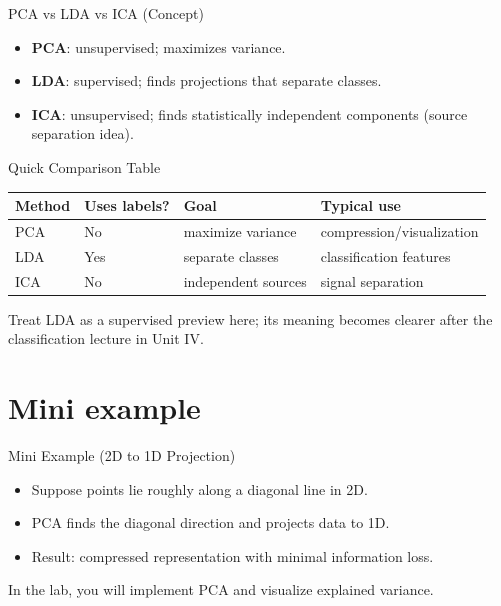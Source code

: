 \documentclass[aspectratio=169]{beamer}
\begin{document}
\begin{frame}{PCA vs LDA vs ICA (Concept)}
  \begin{itemize}[<+->]
    \item \textbf{PCA}: unsupervised; maximizes variance.
    \item \textbf{LDA}: supervised; finds projections that separate classes.
    \item \textbf{ICA}: unsupervised; finds statistically independent components (source separation idea).
  \end{itemize}
\end{frame}

\begin{frame}{Quick Comparison Table}
  \centering
  \begin{tabular}{llll}
    \toprule
    \textbf{Method} & \textbf{Uses labels?} & \textbf{Goal} & \textbf{Typical use} \\
    \midrule
    PCA & No & maximize variance & compression/visualization \\
    LDA & Yes & separate classes & classification features \\
    ICA & No & independent sources & signal separation \\
    \bottomrule
  \end{tabular}
  \vspace{0.4em}
  \small Treat LDA as a supervised preview here; its meaning becomes clearer after the classification lecture in Unit IV.
\end{frame}

\section{Mini example}
\label{sec:example}

\begin{frame}{Mini Example (2D to 1D Projection)}
  \begin{itemize}[<+->]
    \item Suppose points lie roughly along a diagonal line in 2D.
    \item PCA finds the diagonal direction and projects data to 1D.
    \item Result: compressed representation with minimal information loss.
  \end{itemize}
  \vspace{0.4em}
  In the lab, you will implement PCA and visualize explained variance.
\end{frame}
\end{document}

